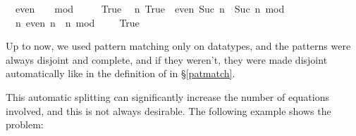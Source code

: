 \begin{isabellebody}
\begin{isamarkuptxt}
  \begin{isabelle}%
\ {}{}\ even\ {}\ {}\ {}{}\ mod\ {}\ {}\ {}{}\isanewline
\ {}{}\ True\isanewline
\ {}{}\ {}n{}\ True\ {}\ even\ {}Suc\ n{}\ {}\ {}Suc\ n\ mod\ {}\ {}\ {}{}\isanewline
\ {}{}\ {}n{}\ even\ n\ {}\ {}n\ mod\ {}\ {}\ {}{}\ {}\ True%
\end{isabelle}%
\end{isamarkuptxt}%
\isamarkuptrue%
\isamarkupfalse%
%
\endisatagproof
{\isafoldproof}%
%
\isadelimproof
%
\endisadelimproof
%
\isamarkuptrue%
%
\begin{isamarkuptext}%
\label{genpats}%
\end{isamarkuptext}%
\isamarkuptrue%
%
\isamarkuptrue%
%
\begin{isamarkuptext}%
Up to now, we used pattern matching only on datatypes, and the
  patterns were always disjoint and complete, and if they weren't,
  they were made disjoint automatically like in the definition of
   in \S\ref{patmatch}.

  This automatic splitting can significantly increase the number of
  equations involved, and this is not always desirable. The following
  example shows the problem:
  

\end{isamarkuptext}
\end{isabellebody}
